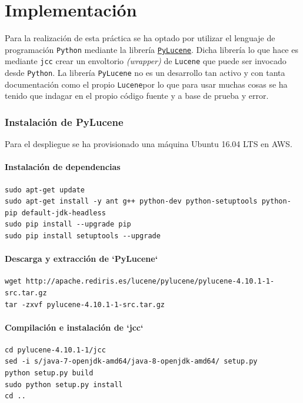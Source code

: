 \chapter{Implementación}

Para la realización de esta práctica se ha optado por utilizar el
lenguaje de programación \texttt{Python} mediante la librería
\href{http://lucene.apache.org/pylucene/}{\texttt{PyLucene}}. Dicha
librería lo que hace es mediante \texttt{jcc} crear un envoltorio
\emph{(wrapper)} de \texttt{Lucene} que puede ser invocado desde
\texttt{Python}. La librería \texttt{PyLucene} no es un desarrollo tan
activo y con tanta documentación como el propio \texttt{Lucene}por lo
que para usar muchas cosas se ha tenido que indagar en el propio código
fuente y a base de prueba y error.


\subsection{Instalación de PyLucene}

Para el despliegue se ha provisionado una máquina Ubuntu 16.04 LTS en AWS.

\subsubsection{Instalación de dependencias}
\begin{lstlisting}
sudo apt-get update
sudo apt-get install -y ant g++ python-dev python-setuptools python-pip default-jdk-headless
sudo pip install --upgrade pip
sudo pip install setuptools --upgrade
\end{lstlisting}

\subsubsection{Descarga y extracción de `PyLucene`}
\begin{lstlisting}
wget http://apache.rediris.es/lucene/pylucene/pylucene-4.10.1-1-src.tar.gz
tar -zxvf pylucene-4.10.1-1-src.tar.gz
\end{lstlisting}

\subsubsection{Compilación e instalación de `jcc`}
\begin{lstlisting}
cd pylucene-4.10.1-1/jcc
sed -i s/java-7-openjdk-amd64/java-8-openjdk-amd64/ setup.py
python setup.py build
sudo python setup.py install
cd ..
\end{lstlisting}

